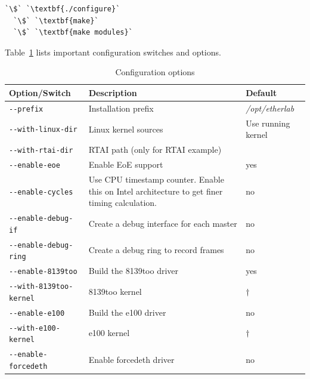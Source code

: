 \documentclass[a4paper,12pt,BCOR6mm,bibtotoc,idxtotoc]{scrbook}
\begin{document}
\begin{lstlisting}[gobble=2]
  `\$` `\textbf{./configure}`
  `\$` `\textbf{make}`
  `\$` `\textbf{make modules}`
\end{lstlisting}

Table~\ref{tab:config} lists important configuration switches and options.

\begin{table}
  \caption{Configuration options}
  \label{tab:config}
  \vspace{2mm}
  \begin{tabular}{l|p{}|l}

\bf Option/Switch & \bf Description & \bf Default\\\hline

\lstinline+--prefix+ & Installation prefix & \textit{/opt/etherlab}\\

\lstinline+--with-linux-dir+ & Linux kernel sources & Use running kernel\\

\lstinline+--with-rtai-dir+ & RTAI path (only for RTAI example) & \\

\hline

\lstinline+--enable-eoe+ & Enable EoE support & yes\\

\lstinline+--enable-cycles+ & Use CPU timestamp counter. Enable this on Intel
architecture to get finer timing calculation. & no\\

\lstinline+--enable-debug-if+ & Create a debug interface for each master & no\\

\lstinline+--enable-debug-ring+ & Create a debug ring to record frames & no\\

\hline

\lstinline+--enable-8139too+ & Build the 8139too driver & yes\\

\lstinline+--with-8139too-kernel+ & 8139too kernel & $\dagger$\\

\lstinline+--enable-e100+ & Build the e100 driver & no\\

\lstinline+--with-e100-kernel+ & e100 kernel & $\dagger$\\

\lstinline+--enable-forcedeth+ & Enable forcedeth driver & no\\


\end{tabular}
\end{table}
\end{document}
